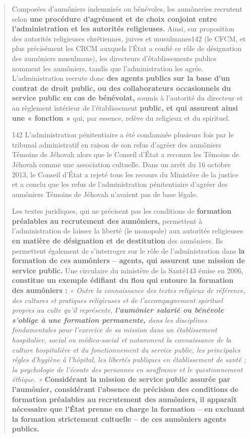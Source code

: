 \begin{quote}
Composées d'aumôniers indemnisés ou bénévoles, les aumôneries recrutent
selon \textbf{une procédure d'agrément et de choix conjoint entre
l'administration et les autorités religieuses.} Ainsi, sur proposition
des autorités religieuses chrétiennes, juives et musulmanes142 (le CFCM,
et plus précisément les CRCM auxquels l'État a confié ce rôle de
désignation des aumôniers musulmans), les directeurs d'établissements
publics nomment les aumôniers, tandis que l'administration les agrée.
L'administration recrute donc \textbf{des agents publics sur la base
d'un contrat de droit public, ou des collaborateurs occasionnels du
service public en cas de bénévolat,} soumis à l'autorité du directeur et
au règlement intérieur de l'établissement \textbf{public, et qui
assurent ainsi une « fonction »} qui, par essence, relève du religieux
et du spirituel.

142 L'administration pénitentiaire a été condamnée plusieurs fois par le
tribunal administratif en raison de son refus d'agréer des aumôniers
Témoins de Jéhovah alors que le Conseil d'État a reconnu les Témoins de
Jéhovah comme une association cultuelle. Dans un arrêt du 16 octobre
2013, le Conseil d'État a rejeté tous les recours du Ministère de la
justice et a conclu que les refus de l'administration pénitentiaire
d'agréer des aumôniers Témoins de Jéhovah n'avaient pas de base légale.



Les textes juridiques, qui ne précisent pas les conditions de
\textbf{formation préalables au recrutement des aumôniers,} permettent à
l'administration de laisser la liberté (le monopole) aux autorités
religieuses \textbf{en matière de désignation et de destitution} des
aumôniers. Ils permettent également de s'interroger sur le rôle de
l'administration dans \textbf{la formation de ces aumôniers -- agents,
qui assurent une mission de service public.} Une circulaire du ministère
de la Santé143 émise en 2006, \textbf{constitue un exemple édifiant du
flou qui entoure la formation des aumôniers :} \emph{« Outre la
connaissance des textes religieux de référence, des cultures et
pratiques religieuses et de l'accompagnement spirituel propres au culte
qu'il représente, \textbf{l'aumônier salarié ou bénévole s'oblige à une
formation permanente,} dans les disciplines fondamentales pour
l'exercice de sa mission dans un établissement hospitalier, social ou
médico-social et notamment la connaissance de la culture hospitalière et
du fonctionnement du service public, les principales règles d'hygiène à
l'hôpital, les libertés publiques en établissement de santé ; la
psychologie de l'écoute des personnes en souffrance et le questionnement
éthique. »} \textbf{Considérant la mission de service public assurée par
l'aumônier, considérant l'absence de précision des conditions de
formation préalables au recrutement des aumôniers, il apparaît
nécessaire que l'État prenne en charge la formation -- en excluant la
formation strictement cultuelle -- de ces aumôniers agents publics.}
\end{quote}

